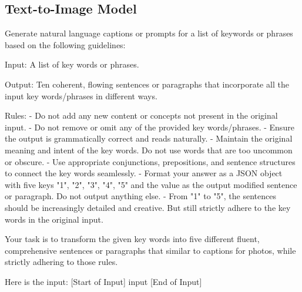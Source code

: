 \subsection{Text-to-Image Model}
\begin{tcolorbox}[prompt, title=Truthfulness Diversity Enhance Prompt]
Generate natural language captions or prompts for a list of keywords or phrases based on the following guidelines:
    
Input: A list of key words or phrases.

Output: Ten coherent, flowing sentences or paragraphs that incorporate all the input key words/phrases in different ways.

Rules:
- Do not add any new content or concepts not present in the original input.
- Do not remove or omit any of the provided key words/phrases.
- Ensure the output is grammatically correct and reads naturally.
- Maintain the original meaning and intent of the key words. Do not use words that are too uncommon or obscure.
- Use appropriate conjunctions, prepositions, and sentence structures to connect the key words seamlessly. 
- Format your answer as a JSON object with five keys "1", "2", "3", "4", "5" and the value as the output modified sentence or paragraph. Do not output anything else.
- From "1" to "5", the sentences should be increasingly detailed and creative. But still strictly adhere to the key words in the original input.

Your task is to transform the given key words into five different fluent, comprehensive sentences or paragraphs that similar to captions for photos, while strictly adhering to those rules.

Here is the input:
[Start of Input]
{input}
[End of Input]
\end{tcolorbox}

\newpage
